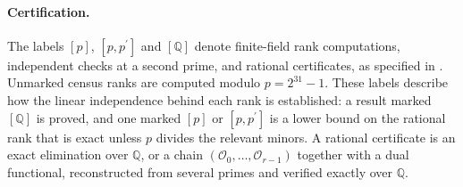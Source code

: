 \documentclass[11pt]{article}
\numberwithin{equation}{section}
\numberwithin{figure}{section}
\numberwithin{table}{section}
\begin{document}
\paragraph{Certification.} The labels $[p]$, $[p,p^{\prime}]$ and $[\mathbb Q]$ denote finite-field rank computations, independent checks at a second prime, and rational certificates, as specified in \cite[supplement, Section S1.7]{Repo}. Unmarked census ranks are computed modulo $p=2^{31}-1$. These labels describe how the linear independence behind each rank is established: a result marked $[\mathbb Q]$ is proved, and one marked $[p]$ or $[p,p^{\prime}]$ is a lower bound on the rational rank that is exact unless $p$ divides the relevant minors. A rational certificate is an exact elimination over $\mathbb Q$, or a chain $(\mathcal O_0,\ldots,\mathcal O_{r-1})$ together with a dual functional, reconstructed from several primes and verified exactly over $\mathbb Q$.
\end{document}
